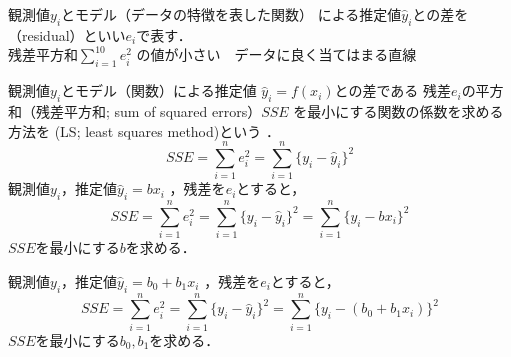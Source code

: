\MyFrame{}
{
  観測値$y_i$とモデル（データの特徴を表した関数）
  による推定値$\hat{y}_i$との差を
  （residual）といい$e_i$で表す．\\
  残差平方和$\sum_{i=1}^{10} e_i^2$
  の値が小さい~\ra~データに良く当てはまる直線\\[3mm]
  \begin{minipage}{0.3\textwidth}
  \end{minipage}
  \begin{minipage}{0.3\textwidth}
  \end{minipage}
  \begin{minipage}{0.3\textwidth}
  \end{minipage}
  \begin{minipage}{0.3\textwidth}
  \end{minipage}
  \begin{minipage}{0.3\textwidth}
  \end{minipage}
  \begin{minipage}{0.3\textwidth}
  \end{minipage}
}

{
}

\MyFrame{}
{
  {
    観測値$y_i$とモデル（関数）による推定値
    $\hat{y}_i=f(x_i)$との差である
    残差$e_i$の平方和（残差平方和; sum of squared errors）$SSE$
    を最小にする関数の係数を求める方法を
    (LS; least squares method)という ．
    \[
      SSE=\sum_{i=1}^n e_i^2
         =\sum_{i=1}^n\big\{y_i-\hat{y}_i\big\}^2
    \]
  }
  {
    観測値$y_i$，推定値$\hat{y}_i=b x_i$
    ，残差を$e_i$とすると，
    \[
      SSE=\sum_{i=1}^n e_i^2
         =\sum_{i=1}^n\big\{y_i-\hat{y}_i\big\}^2
         =\sum_{i=1}^n\big\{y_i-b x_i\big\}^2
    \]
    $SSE$を最小にする$b$を求める．
  }
}

\MyFrame{\insertsection}
{
  {
    観測値$y_i$，推定値$\hat{y}_i=b_0+b_1 x_i$
    ，残差を$e_i$とすると，
    \[
      SSE=\sum_{i=1}^n e_i^2
         =\sum_{i=1}^n\big\{y_i-\hat{y}_i\big\}^2
         =\sum_{i=1}^n\big\{y_i-(b_0+b_1 x_i)\big\}^2
    \]
    $SSE$を最小にする$b_0,b_1$を求める．
  }
}

